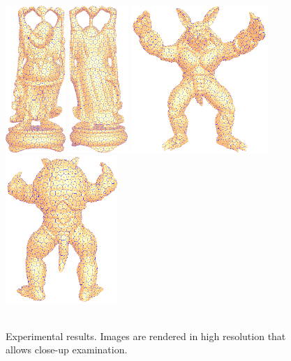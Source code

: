 \begin{figure}[htbp]
\\
\includegraphics[height=2.2in]{figs/cvt/buddha_nf402k_s1600_front.png}
\includegraphics[height=2.2in]{figs/cvt/buddha_nf402k_s1600_back.png}
\includegraphics[height=2.2in]{figs/cvt/armadillo_seed1600_front.png}
\includegraphics[height=2.2in]{figs/cvt/armadillo_seed1600_back.png}\\
\\
\caption{Experimental results. Images are rendered in high
resolution that allows close-up examination.}
  \label{fig:remesh_results}
\end{figure}

